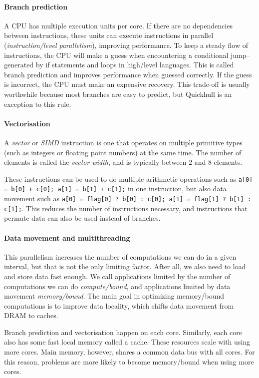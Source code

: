 \documentclass[11pt,a4paper]{article}
\begin{document}
\paragraph{Branch prediction}
A CPU has multiple execution units per core.
If there are no dependencies between instructions, these units can execute instructions in parallel (\emph{instruction\-/level parallelism}), improving performance.
To keep a steady flow of instructions, the CPU will make a guess when encountering a conditional jump\---generated by if statements and loops in high\-/level languages.
This is called branch prediction and improves performance when guessed correctly.
If the guess is incorrect, the CPU must make an expensive recovery.
This trade-off is usually worthwhile because most branches are easy to predict, but Quickhull is an exception to this rule.

\paragraph{Vectorisation}
A \emph{vector} or \emph{SIMD} instruction is one that operates on multiple primitive types (such as integers or floating point numbers) at the same time.
The number of elements is called the \emph{vector width}, and is typically between $2$ and $8$ elements.

These instructions can be used to do multiple arithmetic operations such as \texttt{a[0] = b[0] + c[0]; a[1] = b[1] + c[1];} in one instruction, but also data movement such as \texttt{a[0] = flag[0] ? b[0] : c[0]; a[1] = flag[1] ? b[1] : c[1];}.
This reduces the number of instructions necessary, and instructions that permute data can also be used instead of branches.

\paragraph{Data movement and multithreading}
This parallelism increases the number of computations we can do in a given interval, but that is not the only limiting factor.
After all, we also need to load and store data fast enough.
We call applications limited by the number of computations we can do \emph{compute\-/bound}, and applications limited by data movement \emph{memory\-/bound}.
The main goal in optimizing memory\-/bound computations is to improve data locality, which shifts data movement from DRAM to caches.

Branch prediction and vectorisation happen on each core.
Similarly, each core also has some fast local memory called a cache.
These resources scale with using more cores.
Main memory, however, shares a common data bus with all cores.
For this reason, problems are more likely to become memory\-/bound when using more cores.
\end{document}
